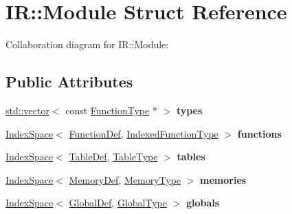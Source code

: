 \hypertarget{struct_i_r_1_1_module}{}\section{IR\+:\+:Module Struct Reference}
\label{struct_i_r_1_1_module}


Collaboration diagram for IR\+:\+:Module\+:
\subsection*{Public Attributes}
\begin{DoxyCompactItemize}
\item 
\mbox{\label{struct_i_r_1_1_module_a682c9e762448410a20c98ea062a50308}} 
\mbox{\hyperlink{classstd_1_1vector}{std\+::vector}}$<$ const \mbox{\hyperlink{struct_i_r_1_1_function_type}{Function\+Type}} $\ast$ $>$ {\bfseries types}
\item 
\mbox{\label{struct_i_r_1_1_module_a439e1f32fa3fa9bf47f58ac309bfc50a}} 
\mbox{\hyperlink{struct_i_r_1_1_index_space}{Index\+Space}}$<$ \mbox{\hyperlink{struct_i_r_1_1_function_def}{Function\+Def}}, \mbox{\hyperlink{struct_i_r_1_1_indexed_function_type}{Indexed\+Function\+Type}} $>$ {\bfseries functions}
\item 
\mbox{\label{struct_i_r_1_1_module_a3093728dba0995da777601adf56082d1}} 
\mbox{\hyperlink{struct_i_r_1_1_index_space}{Index\+Space}}$<$ \mbox{\hyperlink{struct_i_r_1_1_table_def}{Table\+Def}}, \mbox{\hyperlink{struct_i_r_1_1_table_type}{Table\+Type}} $>$ {\bfseries tables}
\item 
\mbox{\label{struct_i_r_1_1_module_a27e85034ab34b4db4321603722d3917c}} 
\mbox{\hyperlink{struct_i_r_1_1_index_space}{Index\+Space}}$<$ \mbox{\hyperlink{struct_i_r_1_1_memory_def}{Memory\+Def}}, \mbox{\hyperlink{struct_i_r_1_1_memory_type}{Memory\+Type}} $>$ {\bfseries memories}
\item 
\mbox{\label{struct_i_r_1_1_module_ab1340b21e56875a7f1163d1afcf4d7fd}} 
\mbox{\hyperlink{struct_i_r_1_1_index_space}{Index\+Space}}$<$ \mbox{\hyperlink{struct_i_r_1_1_global_def}{Global\+Def}}, \mbox{\hyperlink{struct_i_r_1_1_global_type}{Global\+Type}} $>$ {\bfseries globals}

\end{DoxyCompactItemize}
